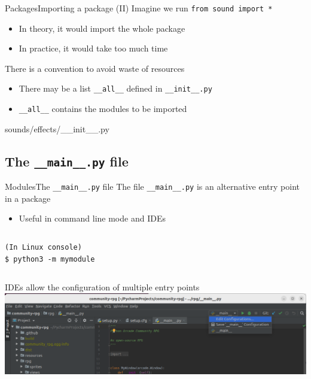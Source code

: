 \documentclass[10pt,compress]{beamer} %
\begin{document}
\begin{frame}{Packages}{Importing a package (II)}
	Imagine we run \texttt{from sound import *}
		\begin{itemize}
		\item In theory, it would import the whole package
		\item In practice, it would take too much time
		\end{itemize}
	There is a convention to avoid waste of resources
		\begin{itemize}
		\item There may be a list \texttt{\_\_all\_\_} defined in \texttt{\_\_init\_\_.py}
		\item \texttt{\_\_all\_\_} contains the modules to be imported
		\end{itemize}

	\begin{exampleblock}{sounds/effects/\_\_init\_\_.py}
	\vspace{-0.2cm}
	
	\vspace{-0.2cm}
	\end{exampleblock}
\end{frame}

\subsection{The \texttt{\_\_main\_\_.py} file}

\begin{frame}[fragile]{Modules}{The \texttt{\_\_main\_\_.py} file}
	The file \texttt{\_\_main\_\_.py} is an alternative entry point in a package
		\begin{itemize}
			\item Useful in command line mode and IDEs
		\end{itemize}

	\begin{columns}
	\begin{exampleblock}{}
	\vspace{-0.2cm}
	\begin{verbatim}
(In Linux console)
$ python3 -m mymodule
\end{verbatim}
	\vspace{-0.2cm}
	\end{exampleblock}
	\end{columns}

    \medskip
    IDEs allow the configuration of multiple entry points\\
    \smallskip
	    \includegraphics[width=0.8\linewidth]{figs/main-configuration}
\end{frame}
\end{document}
